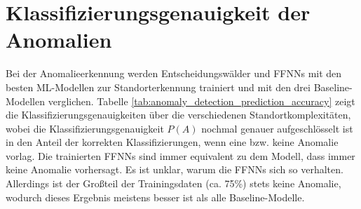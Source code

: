 \section{Klassifizierungsgenauigkeit der Anomalien}
\label{sec:eval_anomalieerkennung}
Bei der Anomalieerkennung werden Entscheidungswälder und FFNNs mit den besten ML-Modellen zur Standorterkennung trainiert und mit den drei Baseline-Modellen verglichen.
Tabelle \ref{tab:anomaly_detection_prediction_accuracy} zeigt die Klassifizierungsgenauigkeiten über die verschiedenen Standortkomplexitäten,
wobei die Klassifizierungsgenauigkeit $P(A)$ nochmal genauer aufgeschlösselt ist in den Anteil der korrekten Klassifizierungen, wenn eine bzw. keine Anomalie vorlag.
Die trainierten FFNNs sind immer equivalent zu dem Modell, dass immer keine Anomalie vorhersagt.
Es ist unklar, warum die FFNNs sich so verhalten.
Allerdings ist der Großteil der Trainingsdaten (ca. 75\%) stets keine Anomalie, wodurch dieses Ergebnis meistens besser ist als alle Baseline-Modelle.
